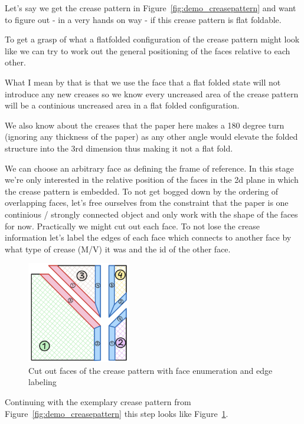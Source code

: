 Let's say we get the crease pattern in Figure~\ref{fig:demo_creasepattern} and want to figure out - in a very hands on way - if this crease pattern is flat foldable.

To get a grasp of what a flatfolded configuration of the crease pattern might look like we can try to work out the general positioning of the faces relative to each other.

What I mean by that is that we use the face that a flat folded state will not introduce any new creases so we know every
uncreased area of the crease pattern will be a continious uncreased area in a flat folded configuration.

We also know about the creases that the paper here makes a 180 degree turn (ignoring any thickness of the paper) as any
other angle would elevate the folded structure into the 3rd dimension thus making it not a flat fold.

We can choose an arbitrary face as defining the frame of reference.
In this stage we're only interested in the relative position of the faces in the 2d plane in which the crease pattern is embedded.
To not get bogged down by the ordering of overlapping faces, let's free ourselves from the constraint that the paper is one continious / strongly connected object and only work with the shape of the faces for now.
Practically we might cut out each face. To not lose the crease information let's label the edges of each
face which connects to another face by what type of crease (M/V) it was and the id of the other face.

\begin{figure}[h]
\centering
\includegraphics[width=0.4\textwidth]{assets/demo_faces.png}
\caption{Cut out faces of the crease pattern with face enumeration and edge labeling}
\label{fig:demo_faces}
\end{figure}

Continuing with the exemplary crease pattern from Figure~\ref{fig:demo_creasepattern} this step looks like Figure~\ref{fig:demo_faces}.

